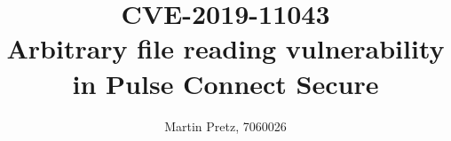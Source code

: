 \documentclass[a4paper,10pt,twocolumn]{article}
\begin{document}

\author{Martin Pretz, 7060026}
\title{\huge CVE-2019-11043 \\ \small Arbitrary file reading vulnerability in Pulse Connect Secure}
\maketitle








\clearpage
\small
\onecolumn
\printbibliography
\end{document}
